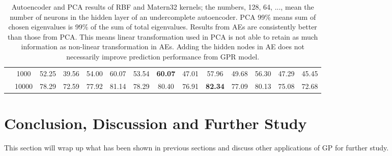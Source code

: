 \documentclass[11pt,a4paper]{article}
\theoremstyle{definition}
\numberwithin{equation}{section}
\begin{document}
\begin{table}
{\begin{tabular}{c|c|cc|cc|cc|cc|cc|cc}
				& 1000  & 52.25 & 39.56            & 54.00 & 60.07            & 53.54 & \textbf{60.07}  & 47.01 & 57.96           & 49.68 & 56.30           & 47.29 & 45.45                 \\
				& 10000 & 78.29 & 72.59            & 77.92 & 81.14            & 78.29 & 80.40           & 76.91 & \textbf{82.34}  & 77.09 & 80.13           & 75.08 & 72.68                 \\
				\bottomrule
			\end{tabular}}
			\caption{Autoencoder and PCA results of RBF and Matern32 kernels; the numbers, 128, 64, ..., mean the number of neurons in the hidden layer of an undercomplete autoencoder. PCA 99\% means sum of chosen eigenvalues is 99\% of the sum of total eigenvalues. Results from AEs are consistently better than those from PCA. This means linear transformation used in PCA is not able to retain as much information as non-linear transformation in AEs. Adding the hidden nodes in AE does not necessarily improve prediction performance from GPR model.}
			\label{dim_red_res}
		\end{table}
		
		
		\newpage
		\section{Conclusion, Discussion and Further Study}
		
		This section will wrap up what has been shown in previous sections and discuss other applications of GP for further study.
		
\end{document}
